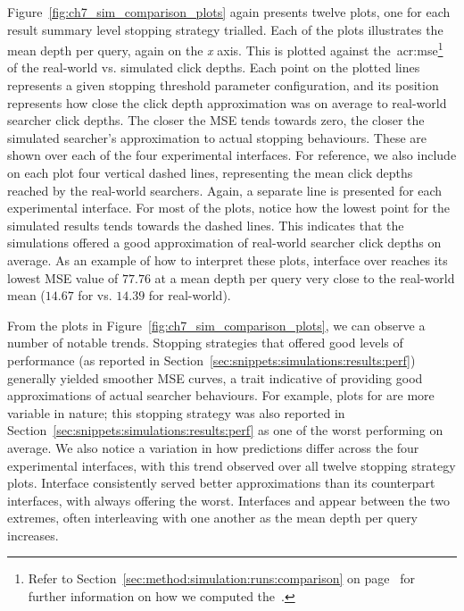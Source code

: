 Figure~\ref{fig:ch7_sim_comparison_plots} again presents twelve plots, one for each result summary level stopping strategy trialled. Each of the plots illustrates the mean depth per query, again on the \emph{x} axis. This is plotted against the~\gls{acr:mse}\footnote{Refer to Section~\ref{sec:method:simulation:runs:comparison} on page~\pageref{sec:method:simulation:runs:comparison} for further information on how we computed the~.} of the real-world vs. simulated click depths. Each point on the plotted lines represents a given stopping threshold parameter configuration, and its position represents how close the click depth approximation was on average to real-world searcher click depths. The closer the MSE tends towards zero, the closer the simulated searcher's approximation to actual stopping behaviours. These are shown over each of the four experimental interfaces. For reference, we also include on each plot four vertical dashed lines, representing the mean click depths reached by the real-world searchers. Again, a separate line is presented for each experimental interface. For most of the plots, notice how the lowest point for the simulated results tends towards the dashed lines. This indicates that the simulations offered a good approximation of real-world searcher click depths on average. As an example of how to interpret these plots, interface  over  reaches its lowest MSE value of $77.76$ at a mean depth per query very close to the real-world mean ($14.67$ for  vs. $14.39$ for real-world).

From the plots in Figure~\ref{fig:ch7_sim_comparison_plots}, we can observe a number of notable trends. Stopping strategies that offered good levels of performance (as reported in Section~\ref{sec:snippets:simulations:results:perf}) generally yielded smoother MSE curves, a trait indicative of providing good approximations of actual searcher behaviours. For example, plots for  are more variable in nature; this stopping strategy was also reported in Section~\ref{sec:snippets:simulations:results:perf} as one of the worst performing on average. We also notice a variation in how predictions differ across the four experimental interfaces, with this trend observed over all twelve stopping strategy plots. Interface  consistently served better approximations than its counterpart interfaces, with  always offering the worst. Interfaces  and  appear between the two extremes, often interleaving with one another as the mean depth per query increases.

